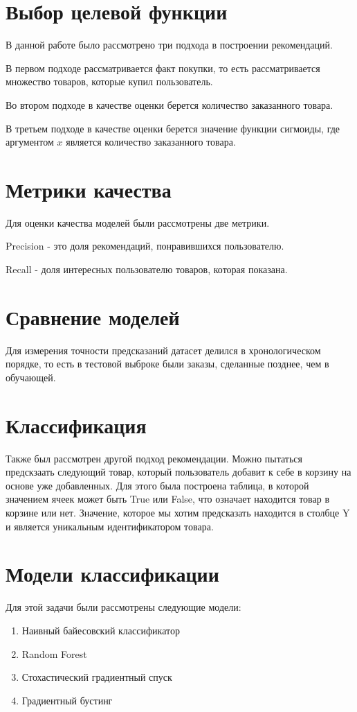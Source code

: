\documentclass{fefu}
\begin{document}
  \section{Выбор целевой функции}
  В данной работе было рассмотрено три подхода в построении рекомендаций.

  В первом подходе рассматривается факт покупки, то есть рассматривается множество
  товаров, которые купил пользователь.

  Во втором подходе в качестве оценки берется количество заказанного товара.

  В третьем подходе в качестве оценки берется значение функции сигмоиды, где аргументом
  $x$ является количество заказанного товара.

  \section{Метрики качества}
  Для оценки качества моделей были рассмотрены две метрики.

  Precision - это доля рекомендаций, понравившихся пользователю.

  Recall - доля интересных пользователю товаров, которая показана.

  \section{Сравнение моделей}
  Для измерения точности предсказаний датасет делился в хронологическом порядке,
  то есть в тестовой выброке были заказы, сделанные позднее, чем в обучающей.

  \section{Классификация}
  Также был рассмотрен другой подход рекомендации. Можно пытаться предскзаать
  следующий товар, который пользователь добавит к себе в корзину на основе уже добавленных.
  Для этого была построена таблица, в которой значением ячеек может быть True или False, что означает
  находится товар в корзине или нет. Значение, которое мы хотим предсказать находится
  в столбце Y и является уникальным идентификатором товара.

  \section{Модели классификации}
  Для этой задачи были рассмотрены следующие модели:
  \begin{enumerate}
    \item Наивный байесовский классификатор
    \item Random Forest
    \item Стохастический градиентный спуск
    \item Градиентный бустинг
  \end{enumerate}
\end{document}
